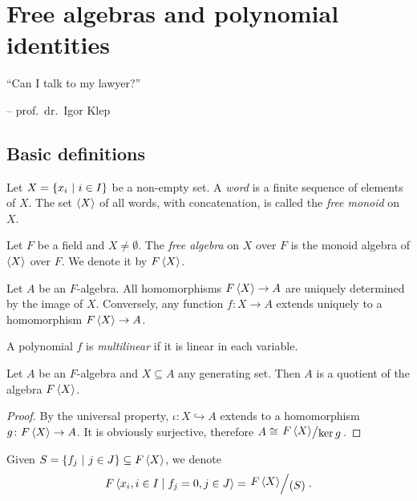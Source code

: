 \section{Free algebras and polynomial identities}

\epigraph{``Can I talk to my lawyer?''}{-- prof.~dr.~Igor Klep}

\subsection{Basic definitions}

\begin{definicija}
Let $X = \left\{x_i~\middle\vert~i \in I\right\}$ be a non-empty set. A
\emph{word} is a finite sequence of elements of $X$.
The set $\left\langle X\right\rangle$ of all words, with concatenation, is called the
\emph{free monoid} on $X$.
\end{definicija}

\begin{definicija}
Let $F$ be a field and $X \ne \emptyset$. The
\emph{free algebra} on $X$ over $F$ is the
monoid algebra of $\left\langle X\right\rangle$ over $F$. We denote it by $F \left\langle X\right\rangle$.
\end{definicija}

\begin{izrek}
Let $A$ be an $F$-algebra. All homomorphisms $F \left\langle X\right\rangle \to A$ are
uniquely determined by the image of $X$. Conversely, any function
$f \colon X \to A$ extends uniquely to a homomorphism
$F \left\langle X\right\rangle \to A$.
\end{izrek}

\obvs

\begin{definicija}
A polynomial $f$ is
\emph{multilinear} if it is linear in
each variable.
\end{definicija}

\begin{trditev}
Let $A$ be an $F$-algebra and $X \subseteq A$ any generating set.
Then $A$ is a quotient of the algebra $F \left\langle X\right\rangle$.
\end{trditev}

\begin{proof}
By the universal property, $\iota \colon X \hookrightarrow A$
extends to a homomorphism $g \colon F \left\langle X\right\rangle \to A$. It is
obviously surjective, therefore $A \cong \kvoc{F \skl{X}}{\ker g}$.
\end{proof}

\begin{definicija}
Given $S = \left\{f_j~\middle\vert~j \in J\right\} \subseteq F \left\langle X\right\rangle$, we denote
\[
F \skl{x_i, i \in I \mid f_j = 0, j \in J} = \kvoc{F \skl{X}}{(S)}.
\]
\end{definicija}

